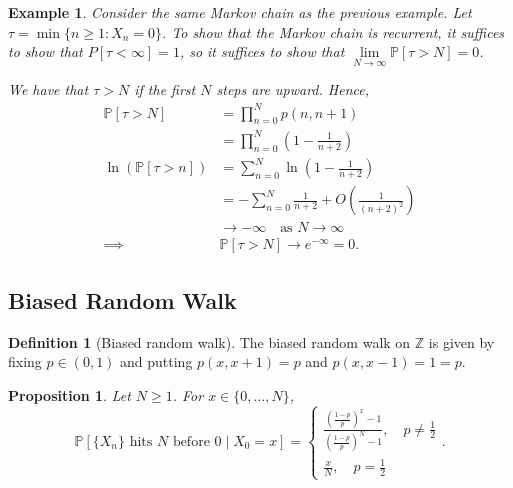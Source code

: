 \documentclass{tufte-handout}
\newcommand*\Z{\mathbb{Z}}
\renewcommand*\P{\mathbb{P}}
\newtheorem{ex}[thm]{Example}
\newtheorem{prop}[thm]{Proposition}
\theoremstyle{definition}
\newtheorem{defn}[thm]{Definition}
\begin{document}
\begin{ex}
	Consider the same Markov chain as the previous example. Let $\tau = \min \{n \ge 1 : X_n = 0\}$.
	To show that the Markov chain is recurrent, it suffices to show that $P\left[ \tau < \infty \right] = 1$, so it suffices to show that $\lim\limits_{N \to \infty} \P\left[\tau > N\right] = 0$.

	We have that $\tau > N$ if the first $N$ steps are upward. Hence,
	\begin{align*}
		\P\left[\tau > N\right] &= \prod_{n=0}^{N} p(n,n+1) \\
								&= \prod\limits_{n=0}^{N} (1-\frac{1}{n+2}) \\
								\ln{(\P\left[\tau > n\right] )} &= \sum\limits_{n=0}^{N} \ln{(1- \frac{1}{n+2})} \\
																&= - \sum\limits_{n=0}^{N} \frac{1}{n+2} +  O\left( \frac{1}{\left( n+2 \right)^2} \right) \\
																&\to -\infty \quad \text{as } N \to \infty \\
								\implies &\P\left[\tau > N\right] \to e^{-\infty}  =0
	.\end{align*}
\end{ex}

\subsection{Biased Random Walk}

\begin{defn}[Biased random walk]
	The biased random walk on $\Z$ is given by fixing $p \in (0,1)$ and putting $p(x,x+1) = p$ and $p(x,x-1) = 1=p$. 
\end{defn}

\begin{prop}
	Let $N \ge 1$. For $x \in \{0,\ldots,N\}$, \[
		\P\left[\{X_n\} \text{ hits } N \text{ before } 0 \mid X_0 = x\right] = \begin{cases}
		\frac{\left( \frac{1-p}{p} \right)^{x} - 1}{\left( \frac{1-p}{p} \right)^{N} - 1}, \quad p \ne \frac{1}{2} \\
		\frac{x}{N}, \quad p = \frac{1}{2}
		\end{cases}
	.\] 
\end{prop}
\end{document}
